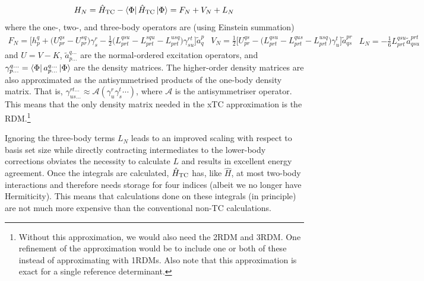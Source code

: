 \begin{equation}
    H_N = \hat H_\mathrm{TC} - \bra{\Phi}\hat H_\mathrm{TC}\ket\Phi = F_N + V_N + L_N
\end{equation}
where the one-, two-, and three-body operators are (using Einstein summation)
\begin{subequations}
    \begin{align}
        F_N =
        \bigg[
            h_p^q
            +\big(U_{pr}^{qs}-U_{pr}^{sq}\big)\gamma^r_s
            -\frac{1}{2}\big(L_{prt}^{qsu}-L_{prt}^{squ}-L_{prt}^{usq}\big)\gamma^{rt}_{su}
        \bigg]\tilde a^{p}_{q}
    \end{align}
    \begin{align}
        V_N =\frac{1}{2} \bigg[
            U_{pr}^{qs}
            -\big(L_{prt}^{qsu}
            -L_{prt}^{qus}-L_{prt}^{usq}\big)\gamma^t_u
        \bigg]\tilde a^{pr}_{qs}
    \end{align}
    \begin{eqnarray}
        \label{eq:LN}
        L_N =-\frac{1}{6} L_{prt}^{qsu}\tilde a^{prt}_{qsu}
    \end{eqnarray}
    \end{subequations}
and $U=V-K$, $\tilde a_{p\dots}^{q\dots}$ are the normal-ordered
excitation operators, and $\gamma_{p\dots}^{q\dots}=\bra\Phi a_{p\dots}^{q\dots}\ket\Phi$ are the density matrices. The higher-order density matrices are also approximated as the antisymmetrised products of the one-body density matrix. That is, $\gamma_{us\dots}^{rt\dots}\approx\mathcal{A}(\gamma_u^r\gamma_s^t\cdots)$, where $\mathcal A$ is the antisymmetriser operator. This means that the only density matrix needed in the xTC approximation is the \gls{RDM}.\footnote{Without this approximation, we would also need the \gls{2RDM} and \gls{3RDM}. One refinement of the approximation would be to include one or both of these instead of approximating with \glspl{1RDM}. Also note that this approximation is exact for a single reference determinant.}

Ignoring the three-body terms $L_N$ leads to an improved scaling with respect to basis set size while directly contracting intermediates to the lower-body corrections obviates the necessity to calculate $L$ and results in excellent energy agreement.\supercite{christlmaierXTC2023} Once the integrals are calculated, $\hat H_\mathrm{TC}$ has, like $\hat H$, at most two-body interactions and therefore needs storage for four indices (albeit we no longer have Hermiticity). This means that calculations done on these integrals (in principle) are not much more expensive than the conventional non-TC calculations.
